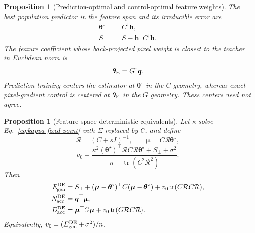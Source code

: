 \documentclass[11pt]{article}
\newtheorem{proposition}[theorem]{Proposition}
\newcommand{\tr}{\operatorname{tr}}
\newcommand{\tstar}{\bm\theta^{\star}}
\newcommand{\Rcal}{\mathcal R}
\begin{document}
\begin{proposition}[Prediction-optimal and control-optimal feature weights]
\label{prop:two-centers}
The best population predictor in the feature span and its irreducible error
are
\begin{align}
  \tstar&=C^{\dagger}\bm h,\label{eq:theta-p}\\
  S_{\perp}&=S-\bm h^{\top}C^{\dagger}\bm h.\label{eq:sperp}
\end{align}
The feature coefficient whose back-projected pixel weight is closest to the
teacher in Euclidean norm is
\begin{equation}
  \bm\theta_{\rm E}=G^{\dagger}\bm q.
  \label{eq:theta-e}
\end{equation}
Prediction training centers the estimator at $\tstar$ in the $C$ geometry,
whereas exact pixel-gradient control is centered at $\bm\theta_{\rm E}$ in the
$G$ geometry. These centers need not agree.
\end{proposition}

\begin{proposition}[Feature-space deterministic equivalents]
\label{prop:feature-de}
Let $\kappa$ solve Eq.~\eqref{eq:kappa-fixed-point} with $\Sigma$ replaced by
$C$, and define
\begin{equation}
  \Rcal=(C+\kappa I)^{-1},
  \qquad
  \bm\mu=C\Rcal\tstar,
\end{equation}
\begin{equation}
  v_0
  =\frac{\kappa^2(\tstar)^{\top}\Rcal C\Rcal\tstar
          +S_{\perp}+\sigma^2}
         {n-\tr(C^2\Rcal^2)}.
  \label{eq:v0}
\end{equation}
Then
\begin{align}
  E_{\rm gen}^{\rm DE}
    &=S_{\perp}
      +(\bm\mu-\tstar)^{\top}C(\bm\mu-\tstar)
      +v_0\tr(C\Rcal C\Rcal),\label{eq:feature-egen-de}\\
  N_{\rm acc}^{\rm DE}
    &=\bm q^{\top}\bm\mu,\label{eq:feature-nacc-de}\\
  D_{\rm acc}^{\rm DE}
    &=\bm\mu^{\top}G\bm\mu
      +v_0\tr(G\Rcal C\Rcal).\label{eq:feature-dacc-de}
\end{align}
Equivalently, $v_0=(E_{\rm gen}^{\rm DE}+\sigma^2)/n$.
\end{proposition}
\end{document}
